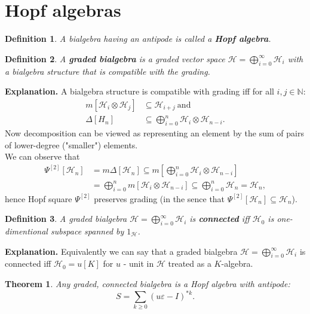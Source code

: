 \documentclass[a4paper, 12pt]{report}
\newtheorem{definition}{Definition}
\newtheorem{theorem}{Theorem}
\begin{document}
\section{Hopf algebras}
\begin{definition}
A bialgebra having an antipode is called a \textbf{Hopf algebra}.
\end{definition}
\begin{definition}
A \textbf{graded bialgebra} is a graded vector space 
$\mathcal{H} = \displaystyle\bigoplus^{\infty}_{i=0}\mathcal{H}_i$ with a bialgebra structure that is 
compatible with the grading.
\end{definition}
\textbf{Explanation. } A bialgebra structure is compatible with grading iff for all $i, j \in \mathbb{N}$:
\begin{align*}
m[\mathcal{H}_i \otimes \mathcal{H}_j] &\subseteq \mathcal{H}_{i+j} \mathrm{\ and} \\
\Delta[H_n] &\subseteq \bigoplus^{n}_{i = 0} \mathcal{H}_i \otimes \mathcal{H}_{n-i}.
\end{align*}
\indent Now decomposition can be viewed as representing an element by the sum of pairs of lower-degree 
("smaller") elements. \\
\indent We can observe that
\begin{align*}
\Psi^{[2]}[\mathcal{H}_n] &= m\Delta[\mathcal{H}_n] \subseteq m[\bigoplus^n_{i = 0} \mathcal{H}_i \otimes 
\mathcal{H}_{n - i}] \\ &= \bigoplus^n_{i = 0} m[\mathcal{H}_i \otimes \mathcal{H}_{n - i}] \subseteq 
\bigoplus^n_{i = 0} \mathcal{H}_n = \mathcal{H}_n,
\end{align*}
hence Hopf square $\Psi^{[2]}$ preserves grading 
(in the sence that $\Psi^{[2]}[\mathcal{H}_n] \subseteq \mathcal{H}_n$).
\begin{definition}
A graded bialgebra $\mathcal{H} = \displaystyle\bigoplus^{\infty}_{i=0}\mathcal{H}_i$ is 
\textbf{connected} iff $\mathcal{H}_0$ is one-dimentional subspace spanned by $1_\mathcal{H}$.
\end{definition}
\noindent \textbf{Explanation. } Equivalently we can say that a graded bialgebra 
$\mathcal{H} = \displaystyle\bigoplus^{\infty}_{i=0}\mathcal{H}_i$ is 
connected iff $\mathcal{H}_0 = u[K]$ for $u$ - unit in $\mathcal{H}$ treated as a $K$-algebra.
\begin{theorem}
Any graded, connected bialgebra is a Hopf algebra with antipode:
\begin{equation*}
S = \sum_{k \geq 0} (u\varepsilon - I)^{*k}.
\end{equation*}
\end{theorem}
\end{document}
